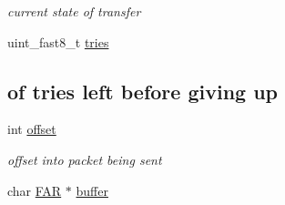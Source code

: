 \begin{DoxyCompactItemize}
\begin{DoxyCompactList}\small\item\em current state of transfer \end{DoxyCompactList}\item 
\hypertarget{group__util__xmodem_ga8623a9a322bbc93025b7c3337ed8849e}{uint\-\_\-fast8\-\_\-t \hyperlink{group__util__xmodem_ga8623a9a322bbc93025b7c3337ed8849e}{tries}}\label{group__util__xmodem_ga8623a9a322bbc93025b7c3337ed8849e}

\begin{DoxyCompactList}\small\item\em \subsection*{of tries left before giving up}\end{DoxyCompactList}\item 
\hypertarget{group__util__xmodem_gaed7ea92f45bd273dde380a45ddced592}{int \hyperlink{group__util__xmodem_gaed7ea92f45bd273dde380a45ddced592}{offset}}\label{group__util__xmodem_gaed7ea92f45bd273dde380a45ddced592}

\begin{DoxyCompactList}\small\item\em offset into packet being sent \end{DoxyCompactList}\item 
\hypertarget{group__util__xmodem_ga747adede719506ced8838721ed104364}{char \hyperlink{group__hal_gaef060b3456fdcc093a7210a762d5f2ed}{F\-A\-R} $\ast$ \hyperlink{group__util__xmodem_ga747adede719506ced8838721ed104364}{buffer}}\label{group__util__xmodem_ga747adede719506ced8838721ed104364}


\end{DoxyCompactItemize}
